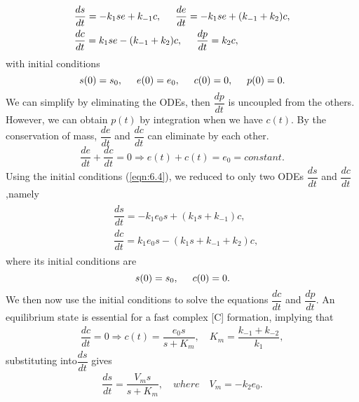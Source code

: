 \documentclass[a4paper]{report}
\theoremstyle{definition}
\begin{document}
\begin{align}
\label{eqn:6.3}
\begin{split}
&\dfrac{ds}{dt}=-k_1se+k_{-1}c, \hspace{5mm} \dfrac{de}{dt}=-k_1se+(k_{-1}+k_2)c,
\\
&\dfrac{dc}{dt}=k_1se-(k_{-1}+k_2)c, \hspace{5mm} \dfrac{dp}{dt}=k_2c,
\end{split}
\end{align}
with initial conditions 
\begin{equation}
\label{eqn:6.4}
s(0)=s_0,\hspace{5mm} e(0)=e_0, \hspace{5mm} c(0)=0, \hspace{5mm} p(0)=0.
\end{equation}
We can simplify by eliminating the ODEs, then $\dfrac{dp}{dt}$ is uncoupled from the others. However, we can obtain $p(t)$ by integration when we have $c(t)$.
By the conservation of mass, $\dfrac{de}{dt}$ and $\dfrac{dc}{dt}$ can eliminate by each other.
\begin{equation}
\label{eqn:6.6}
\dfrac{de}{dt}+\dfrac{dc}{dt}=0\Rightarrow e(t)+c(t)=e_0=constant.
\end{equation}
Using the initial conditions (\ref{eqn:6.4}), we reduced to only two ODEs $\dfrac{ds}{dt}$ and $\dfrac{dc}{dt}$,namely
\begin{align}
\label{equ:6.7}
\begin{split}
&\dfrac{ds}{dt}=-k_1e_0s+(k_1s+k_{-1})c,
\\
&\dfrac{dc}{dt}=k_1e_0s-(k_1s+k_{-1}+k_2)c,
\end{split}
\end{align}
where its initial conditions are
\begin{equation}
\label{equ:6.8}
s(0)=s_0, \hspace{5mm} c(0)=0.
\end{equation}
We then now use the initial conditions to solve the equations $\dfrac{dc}{dt}$ and $\dfrac{dp}{dt}$. An equilibrium state is essential for a fast complex [C] formation, implying that
\newline
\begin{align}
\label{equ:6.9}
\dfrac{dc}{dt}=0\Rightarrow c(t)=\dfrac{e_0s}{s+K_m}, \quad K_m=\dfrac{k_{-1}+k_{-2}}{k_1},
\end{align}
substituting into$\dfrac{ds}{dt}$ gives
\begin{align}
\label{equ:6.10}
\dfrac{ds}{dt}=\dfrac{V_ms}{s+K_m}, \quad where \quad V_m=-k_2e_0.
\end{align}
\end{document}
